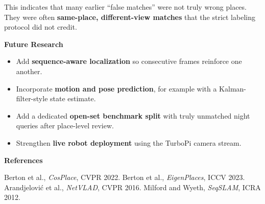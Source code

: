 \documentclass[10pt,twocolumn]{article}
\newcommand{\subhead}[1]{\vspace{0.15em}\textbf{\large\color{accent} #1}\par}
\begin{document}
This indicates that many earlier “false matches” were not truly wrong places. They were often \textbf{same-place, different-view matches} that the strict labeling protocol did not credit.

\subhead{Future Research}
\begin{itemize}[leftmargin=1.2em,itemsep=0.2em]
  \item Add \textbf{sequence-aware localization} so consecutive frames reinforce one another.
  \item Incorporate \textbf{motion and pose prediction}, for example with a Kalman-filter-style state estimate.
  \item Add a dedicated \textbf{open-set benchmark split} with truly unmatched night queries after place-level review.
  \item Strengthen \textbf{live robot deployment} using the TurboPi camera stream.
\end{itemize}

\subhead{References}
\small
Berton et al., \emph{CosPlace}, CVPR 2022. \quad
Berton et al., \emph{EigenPlaces}, ICCV 2023. \quad
Arandjelovi\'c et al., \emph{NetVLAD}, CVPR 2016. \quad
Milford and Wyeth, \emph{SeqSLAM}, ICRA 2012.
\end{document}
